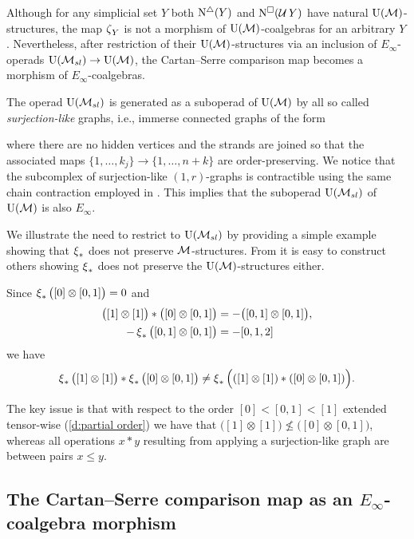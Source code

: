 Although for any simplicial set $Y$ both $\operatorname{N^{\triangle}}(Y)$ and $\operatorname{N^{\square}}(\operatorname{\mathcal{U}} Y)$ have natural ${\operatorname{U}(\mathcal{M})}$-structures, the map $\operatorname{\zeta}_Y$ is not a morphism of ${\operatorname{U}(\mathcal{M})}$-coalgebras for an arbitrary $Y$.
Nevertheless, after restriction of their ${\operatorname{U}(\mathcal{M})}$-structures via an inclusion of $E_\infty$-operads ${\operatorname{U}(\mathcal{M}_{sl})} \to {\operatorname{U}(\mathcal{M})}$, the Cartan--Serre comparison map becomes a morphism of $E_\infty$-coalgebras.

The operad ${\operatorname{U}(\mathcal{M}_{sl})}$ is generated as a suboperad of ${\operatorname{U}(\mathcal{M})}$ by all so called \textit{surjection-like} graphs, i.e., immerse connected graphs of the form

where there are no hidden vertices and the strands are joined so that the associated maps $\{1, \dots, k_j\} \to \{1, \dots, n+k\}$ are order-preserving.
We notice that the subcomplex of surjection-like $(1,r)$-graphs is contractible using the same chain contraction employed in \cite{medina2020prop1}.
This implies that the suboperad ${\operatorname{U}(\mathcal{M}_{sl})}$ of ${\operatorname{U}(\mathcal{M})}$ is also $E_\infty$.

\begin{example}
	We illustrate the need to restrict to ${\operatorname{U}(\mathcal{M}_{sl})}$ by providing a simple example showing that $\operatorname{\xi}_\ast$ does not preserve $\mathcal{M}$-structures.
	From it is easy to construct others showing $\operatorname{\xi}_\ast$ does not preserve the ${\operatorname{U}(\mathcal{M})}$-structures either.

	Since $\operatorname{\xi}_\ast \big( [0] \otimes [0,1] \big) = 0$ and
	\begin{align*}
	\big( [1] \otimes [1] \big) \ast \big( [0] \otimes [0,1] \big) &=
	- \big( [0,1] \otimes [0,1] \big), \\
	- \operatorname{\xi}_\ast \big( [0,1] \otimes [0,1] \big) & = - [0,1,2]
	\end{align*}
	we have
	\[
	\operatorname{\xi}_\ast \big( [1] \otimes [1] \big) \ast \operatorname{\xi}_\ast \big( [0] \otimes [0,1] \big) \neq \operatorname{\xi}_\ast \Big( ([1] \otimes [1]) \ast ([0] \otimes [0,1]) \Big).
	\]

	The key issue is that with respect to the order $[0] < [0,1] < [1]$ extended tensor-wise (\cref{d:partial order}) we have that $\big( [1] \otimes [1] \big) \not\leq \big( [0] \otimes [0,1] \big)$, whereas all operations $x \ast y$ resulting from applying a surjection-like graph are between pairs $x \leq y$.
\end{example}

\subsection{The Cartan--Serre comparison map as an $E_\infty$-coalgebra morphism} \label{ss:the cartan-serre chain map}

